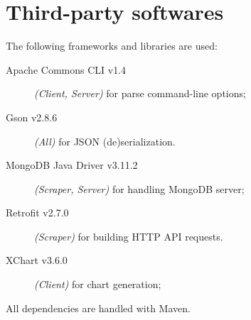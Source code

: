 \section{Third-party softwares}\label{sec:dependencies}

The following frameworks and libraries are used:
\begin{description}
	\item[Apache Commons CLI v1.4] \textit{(Client, Server)} for parse
		command-line options;
	\item[Gson v2.8.6] \textit{(All)} for JSON (de)serialization.
	\item[MongoDB Java Driver v3.11.2] \textit{(Scraper, Server)} for
		handling MongoDB server;
	\item[Retrofit v2.7.0] \textit{(Scraper)} for building HTTP API
		requests.
	\item[XChart v3.6.0] \textit{(Client)} for chart generation;
\end{description}

All dependencies are handled with Maven.
